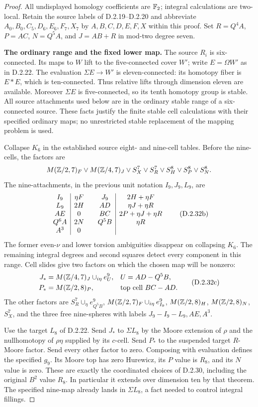 \begin{proof}
All undisplayed homology coefficients are $\mathbb F_2$; integral
calculations are two-local. Retain the source labels of
D.2.19--D.2.20 and abbreviate $A_0,B_0,C_5,D_6,E_6,F_7,X_7$
by $A,B,C,D,E,F,X$ within this proof. Set $R=Q^4A$,
$P=AC$, $N=Q^5A$, and $J=AB+R$ in mod-two degree seven.

\medskip\noindent
\textbf{The ordinary range and the fixed lower map.}
The source $R_i$ is six-connected. Its maps to $W$ lift to the
five-connected cover $W'$; write $E=\Omega W'$ as in D.2.22.
The evaluation $\Sigma E\to W'$ is eleven-connected: its
homotopy fiber is $E*E$, which is ten-connected. Thus relative
lifts through dimension eleven are available. Moreover $\Sigma E$
is five-connected, so its tenth homotopy group is stable. All
source attachments used below are in the ordinary stable range
of a six-connected source. These facts justify the finite stable
cell calculations with their specified ordinary maps; no
unrestricted stable replacement of the mapping problem is used.

Collapse $K_6$ in the established source eight- and nine-cell
tables. Before the nine-cells, the factors are
\[
 M(\mathbb Z/2,7)_F\vee M(\mathbb Z/4,7)_J\vee S^7_X\vee S^7_R
           \vee S^8_H\vee S^8_P\vee S^8_N.
\]
The nine-attachments, in the previous unit notation $I_9,J_9,L_9$,
are
\[
\begin{array}{c|c@{\qquad}c|c}
 I_9&\eta F&J_9&2H+\eta F\\
 L_9&2H&AD&\eta J+\eta R\\
 AE&0&BC&2P+\eta J+\eta R\\
 Q^6A&2N&Q^5B&\eta R\\
 A^3&0&&
\end{array}
 \tag{D.2.32b}
\]
The former even-$\nu$ and lower torsion ambiguities disappear
on collapsing $K_6$. The remaining integral degrees and second
squares detect every component in this range. Cell slides give
two factors on which the chosen map will be nonzero:
\[
 \begin{aligned}
 J_*&=M(\mathbb Z/4,7)_J\cup_{i\eta}e^9_U,
                 &&U=AD-Q^5B,\\
 P_*&=M(\mathbb Z/2,8)_P,
                 &&\text{top cell }BC-AD.
 \end{aligned}
 \tag{D.2.32c}
\]
The other factors are
$S^7_R\cup_\eta e^9_{Q^5B}$,
$M(\mathbb Z/2,7)_F\cup_{i\eta}e^9_{I_9}$,
$M(\mathbb Z/2,8)_H$, $M(\mathbb Z/2,8)_N$, $S^7_X$, and the
three free nine-spheres with labels $J_9-I_9-L_9,AE,A^3$.

Use the target $L_8$ of D.2.22. Send $J_*$ to $\Sigma L_8$
by the Moore extension of $\rho$ and the nullhomotopy of
$\rho\eta$ supplied by its $c$-cell. Send $P_*$ to the
suspended target $R$-Moore factor. Send every other factor
to zero. Composing with evaluation defines the specified
$g_9$. Its Moore top has zero Hurewicz, its $P$ value is
$R_8$, and its $N$ value is zero. These are exactly the
coordinated choices of D.2.30, including the original
$B^2$ value $R_8$. In particular it extends over dimension
ten by that theorem. The specified nine-map already lands
in $\Sigma L_8$, a fact needed to control integral fillings.


\end{proof}
